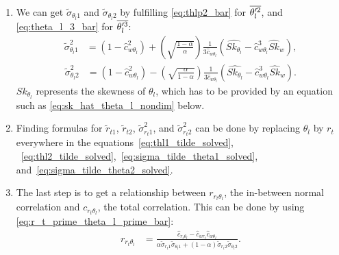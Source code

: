 \begin{enumerate}
    \item We can get $\tilde{\sigma}_{\theta_l 1}$ and $\tilde{\sigma}_{\theta_l 2}$ by fulfilling \cref{eq:thlp2_bar} for $\overline{\theta_l'^2}$,
    and \cref{eq:theta_l_3_bar} for $\overline{\theta_l'^3}$:
    \begin{align}
        \label{eq:sigma_tilde_theta1_solved}
        \tilde{\sigma}_{\theta_l 1}^2
        &= \left(1-\widehat{c}_{w \theta_l}^2 \right) +
        \left(\sqrt{\frac{1 - \alpha}{\alpha}}\right)
        \frac{1}{3 \widehat{c}_{w \theta_l}}
        \left( \widehat{Sk_{\theta_l}} - \widehat{c}_{w \theta_l}^3 \widehat{Sk}_w \right),
    \end{align}
    \begin{align}
        \label{eq:sigma_tilde_theta2_solved}
        \tilde{\sigma}_{\theta_l 2}^2
        &= \left(1 - \widehat{c}_{w \theta_l}^2 \right) -
        \left(\sqrt{\frac{\alpha}{1 - \alpha}}\right)
        \frac{1}{3 \widehat{c}_{w \theta_l}}
        \left( \widehat{Sk_{\theta_l}} - \widehat{c}_{w \theta_l}^3 \widehat{Sk}_w \right).
    \end{align}
    $Sk_{\theta_l}$ represents the skewness of $\theta_l$,
    which has to be provided by an equation such as \cref{eq:sk_hat_theta_l_nondim} below.

    \item Finding formulas for $\tilde{r}_{t1}$, $\tilde{r}_{t2}$, $\tilde{\sigma}_{r_t 1}^2$,
    and $\tilde{\sigma}_{r_t 2}^2$ can be done by replacing $\theta_l$ by $r_t$ everywhere
    in the equations~\eqref{eq:thl1_tilde_solved},
    ~\eqref{eq:thl2_tilde_solved},~\eqref{eq:sigma_tilde_theta1_solved},
    and~\eqref{eq:sigma_tilde_theta2_solved}.

    \item The last step is to get a relationship between $r_{r_t \theta_l}$,
    the in-between normal correlation and $c_{r_t \theta_l}$,
    the total correlation.
    This can be done by using \cref{eq:r_t_prime_theta_l_prime_bar}:
    \begin{align}
        \label{eq:r_r_t_theta_l}
        r_{r_t \theta_l}
        &= \frac{\widehat{c}_{r_t \theta_l} - \widehat{c}_{w r_t} \widehat{c}_{w \theta_l}}
        {\alpha \tilde{\sigma}_{r_{t}1}\tilde{\sigma}_{\theta_{l}1} +
            (1-\alpha) \tilde{\sigma}_{r_{t}2} \tilde{\sigma}_{\theta_{l}2}}.
    \end{align}
\end{enumerate}